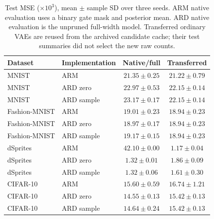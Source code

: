 \begin{table}[H]
\caption{Test MSE ($\times10^3$), mean $\pm$ sample SD over three seeds. ARM native evaluation uses a binary gate mask and posterior mean. ARD native evaluation is the unpruned full-width model. Transferred ordinary VAEs are reused from the archived candidate cache; their test summaries did not select the new raw counts.}\label{tab:newtest}
\small
\setlength{\tabcolsep}{3pt}
\begin{tabular*}{\textwidth}{@{\extracolsep{\fill}}llcc@{}}
\toprule
Dataset & Implementation & Native/full & Transferred \\
\midrule
MNIST & ARM & $21.35 \pm 0.25$ & $21.22 \pm 0.79$ \\
MNIST & ARD zero & $22.97 \pm 0.53$ & $22.15 \pm 0.14$ \\
MNIST & ARD sample & $23.17 \pm 0.17$ & $22.15 \pm 0.14$ \\
Fashion-MNIST & ARM & $19.01 \pm 0.23$ & $18.94 \pm 0.23$ \\
Fashion-MNIST & ARD zero & $18.97 \pm 0.17$ & $18.94 \pm 0.23$ \\
Fashion-MNIST & ARD sample & $19.17 \pm 0.15$ & $18.94 \pm 0.23$ \\
dSprites & ARM & $42.10 \pm 0.00$ & $1.17 \pm 0.04$ \\
dSprites & ARD zero & $1.32 \pm 0.01$ & $1.86 \pm 0.09$ \\
dSprites & ARD sample & $1.32 \pm 0.06$ & $1.61 \pm 0.30$ \\
CIFAR-10 & ARM & $15.60 \pm 0.59$ & $16.74 \pm 1.21$ \\
CIFAR-10 & ARD zero & $14.55 \pm 0.13$ & $15.42 \pm 0.13$ \\
CIFAR-10 & ARD sample & $14.64 \pm 0.24$ & $15.42 \pm 0.13$ \\
\bottomrule\end{tabular*}
\end{table}
